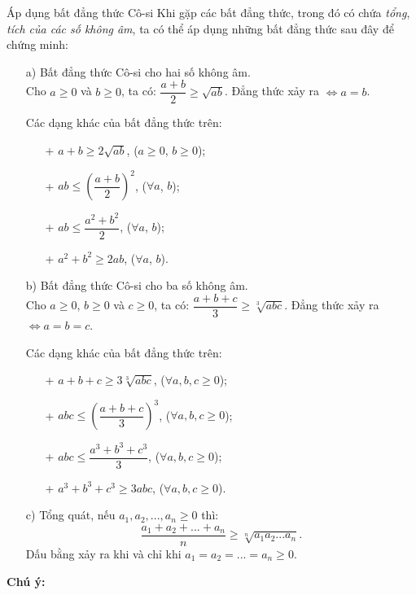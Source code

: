 \begin{dang}{Áp dụng bất đẳng thức Cô-si}
Khi gặp các bất đẳng thức, trong đó có chứa \textit{tổng}, \textit{tích của các số không âm}, ta có thể áp dụng những bất đẳng thức sau đây để chứng minh:
\begin{enumerate}
\item [a)] Bất đẳng thức Cô-si cho hai số không âm.\\
Cho $a\geq 0$ và $b\geq 0$, ta có: $\dfrac{a+b}{2}\geq \sqrt{ab}$. Đẳng thức xảy ra $\Leftrightarrow a=b$.

Các dạng khác của bất đẳng thức trên:
\begin{itemize}
\item [+] $a+b\geq 2\sqrt{ab}$, ($a\geq 0$, $b\geq 0$);
\item [+] $ab\leq \left( \dfrac{a+b}{2}\right)^2$, ($\forall a$, $b$);
\item [+] $ab\leq \dfrac{a^2+b^2}{2}$, ($\forall a$, $b$);
\item [+] $a^2+b^2\geq 2ab$, ($\forall a$, $b$).
\end{itemize}
\item [b)] Bất đẳng thức Cô-si cho ba số không âm.\\
Cho $a\geq 0$, $b\geq 0$ và $c\geq 0$, ta có: $\dfrac{a+b+c}{3}\geq \sqrt[3]{abc}$. Đẳng thức xảy ra $\Leftrightarrow a=b=c$.

Các dạng khác của bất đẳng thức trên:
\begin{itemize}
\item [+] $a+b+c\geq 3\sqrt[3]{abc}$, ($\forall a, b, c\geq 0$);
\item [+] $abc\leq \left(\dfrac{a+b+c}{3}\right)^3$, ($\forall a, b, c\geq 0$);
\item [+] $abc\leq \dfrac{a^3+b^3+c^3}{3}$, ($\forall a, b, c\geq 0$);
\item [+] $a^3+b^3+c^3\geq 3abc$, ($\forall a, b, c\geq 0$).
\end{itemize}
\item [c)] Tổng quát, nếu $a_1, a_2, ..., a_n\geq 0$ thì:
$$\dfrac{a_1+a_2+...+a_n}{n}\geq \sqrt[n]{a_1a_2...a_n}.$$Dấu bằng xảy ra khi và chỉ khi $a_1=a_2=...=a_n\geq 0$.
\end{enumerate}
\end{dang}
\textbf{Chú ý:}


